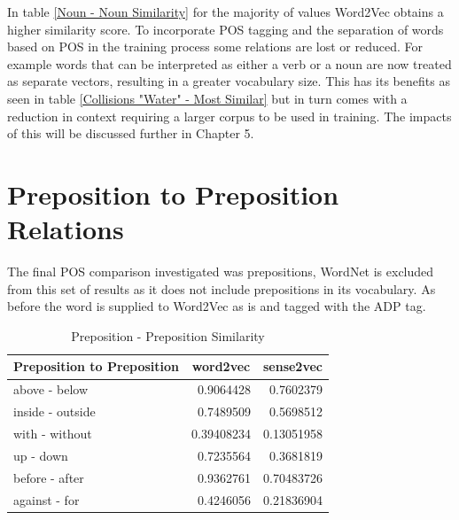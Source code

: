 \noindent
In table \ref{Noun - Noun Similarity} for the majority of values Word2Vec obtains a higher similarity score. To incorporate POS tagging and the separation of words based on POS in the training process some relations are lost or reduced. For example words that can be interpreted as either a verb or a noun are now treated as separate vectors, resulting in a greater vocabulary size. This has its benefits as seen in table \ref{Collisions "Water" - Most Similar} but in turn comes with a reduction in context requiring a larger corpus to be used in training. The impacts of this will be discussed further in Chapter 5.

\section{Preposition to Preposition Relations}
The final POS comparison investigated was prepositions, WordNet is excluded from this set of results as it does not include prepositions in its vocabulary. As before the word is supplied to Word2Vec as is and tagged with the ADP tag.

\begin{table}[h]
\centering
\begin{tabular}{|l|r|r|}
\hline
\multicolumn{1}{|c|}{\textbf{Preposition to Preposition}} & \multicolumn{1}{c|}{\textbf{word2vec}} & \multicolumn{1}{c|}{\textbf{sense2vec}} \\ \hline
above - below                                             & 0.9064428                              & 0.7602379                               \\ \hline
inside - outside                                          & 0.7489509                              & 0.5698512                               \\ \hline
with - without                                            & 0.39408234                             & 0.13051958                              \\ \hline
up - down                                                 & 0.7235564                              & 0.3681819                               \\ \hline
before - after                                            & 0.9362761                              & 0.70483726                              \\ \hline
against - for                                             & 0.4246056                              & 0.21836904                              \\ \hline
\end{tabular}
\caption{Preposition - Preposition Similarity}
\label{Preposition - Preposition Similarity}
\end{table}

